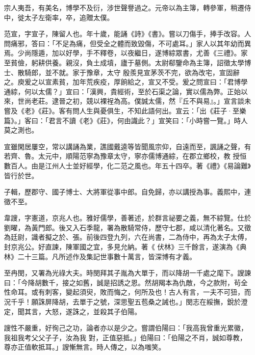 \begin{pinyinscope}
 宗人夷吾，有美名，博學不及衍，涉世聲譽過之。元帝以為主簿，轉參軍，稍遷侍中，徙太子左衛率，卒，追贈太僕。



 范宣，字宣子，陳留人也。年十歲，能誦《詩》《書》。嘗以刀傷手，捧手改容。人問痛邪，答曰：「不足為痛，但受全之體而致毀傷，不可處耳。」家人以其年幼而異焉。少尚隱遁，加以好學，手不釋卷，以夜繼日，遂博綜眾書，尤善《三禮》。家至貧儉，躬耕供養。親沒，負土成墳，廬于墓側。太尉郗鑒命為主簿，詔徵太學博士、散騎郎，並不就。家于豫章，太守
 殷羨見宣茅茨不完，欲為改宅，宣固辭之。庾爰之以宣素貧，加年荒疾疫，厚餉給之，宣又不受。爰之問宣曰：「君博學通綜，何以太儒？」宣曰：「漢興，貴經術，至於石渠之論，實以儒為弊。正始以來，世尚老莊。逮晉之初，競以裸裎為高。僕誠太儒，然『丘不與易』。」宣言談未嘗及《老》《莊》。客有問人生與憂俱生，不知此語何出。宣云：「出《莊子·至樂篇》。」客曰：「君言不讀《老》《莊》，何由識此？」宣笑曰：「小時嘗一覽。」時人莫之測也。



 宣雖閑居屢空，常以講誦為業，譙國戴逵等皆聞風宗仰，自遠而至，諷誦之聲，有若齊、魯。太元中，順陽范寧為豫章太守，寧亦儒博通綜，在郡立鄉校，教
 授恒數百人。由是江州人士並好經學，化二范之風也。年五十四卒。著《禮》《易論難》皆行於世。



 子輯，歷郡守、國子博士、大將軍從事中郎。自免歸，亦以講授為事。義熙中，連徵不至。



 韋謏，字憲道，京兆人也。雅好儒學，善著述，於群言祕要之義，無不綜覽。仕於劉曜，為黃門郎。後又入石季龍，署為散騎常侍，歷守七郡，咸以清化著名。又徵為廷尉，識者擬之於、張。前後四登九列，六在尚書，二為侍中，再為太子太傅，封京兆公。好直諫，陳軍國之宜，多見允納。著《
 伏林》三千餘言，遂演為《典林》二十三篇。凡所述作及集記世事數十萬言，皆深博有才義。



 至冉閔，又署為光祿大夫。時閔拜其子胤為大單于，而以降胡一千處之麾下。謏諫曰：「今降胡數千，接之如舊，誠是招誘之恩。然胡羯本為仇敵，今之款附，茍全性命耳。或有刺客，變起須臾，敗而悔之，何所及也！古人有言，一夫不可狃，而況千乎！願誅屏降胡，去單于之號，深思聖五苞桑之誡也。」閔志在綏撫，銳於澄定，聞其言，大怒，遂誅之，並殺其子伯陽。



 謏性不嚴重，好徇己之功，論者亦以是少之。嘗謂伯陽曰：「我高我曾重光累徽，我祖我考父父子子，汝為我
 對，正值惡抵。」伯陽曰：「伯陽之不肖，誠如尊教，尊亦正值軟抵耳。」謏慚無言。時人傳之，以為嗤笑。




\end{pinyinscope}
